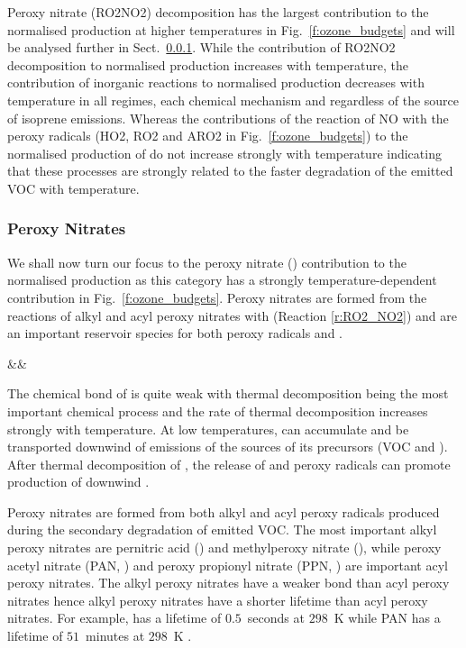 Peroxy nitrate (RO2NO2) decomposition has the largest contribution to the normalised  production at higher temperatures in Fig.~\ref{f:ozone_budgets} and will be analysed further in Sect.~\ref{sss:ro2no2}.
While the contribution of RO2NO2 decomposition to normalised  production increases with temperature, the contribution of inorganic reactions to normalised  production decreases with temperature in all  regimes, each chemical mechanism and regardless of the source of isoprene emissions.
Whereas the contributions of the reaction of NO with the peroxy radicals (HO2, RO2 and ARO2 in Fig.~\ref{f:ozone_budgets}) to the normalised production of  do not increase strongly with temperature indicating that these processes are strongly related to the faster degradation of the emitted VOC with temperature.

\subsubsection{Peroxy Nitrates} \label{sss:ro2no2}
We shall now turn our focus to the peroxy nitrate () contribution to the normalised  production as this category has a strongly temperature-dependent contribution in Fig.~\ref{f:ozone_budgets}.
Peroxy nitrates are formed from the reactions of alkyl and acyl peroxy nitrates with  (Reaction \ref{r:RO2_NO2}) and are an important reservoir species for both peroxy radicals and .
\begin{rxnarray}
    &&  \rightleftharpoons {} \label{r:RO2_NO2}
\end{rxnarray}
The chemical bond of  is quite weak with thermal decomposition being the most important chemical process and the rate of thermal decomposition increases strongly with temperature.
At low temperatures,  can accumulate and be transported downwind of emissions of the sources of its precursors (VOC and ). 
After thermal decomposition of , the release of  and peroxy radicals can promote production of  downwind \citep{Moxim:1996}.

Peroxy nitrates are formed from both alkyl and acyl peroxy radicals produced during the secondary degradation of emitted VOC.
The most important alkyl peroxy nitrates are pernitric acid () and methylperoxy nitrate (), while peroxy acetyl nitrate (PAN, ) and peroxy propionyl nitrate (PPN, ) are important acyl peroxy nitrates.
The alkyl peroxy nitrates have a weaker  bond than acyl peroxy nitrates hence alkyl peroxy nitrates have a shorter lifetime than acyl peroxy nitrates.
For example,  has a lifetime of $0.5$~seconds at $298$~K while PAN has a lifetime of $51$~minutes at $298$~K \citep{Orlando:2012}.

